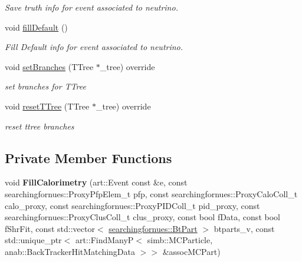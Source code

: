 \begin{DoxyCompactItemize}
\begin{DoxyCompactList}\small\item\em Save truth info for event associated to neutrino. \end{DoxyCompactList}\item 
void \hyperlink{classanalysis_1_1CalorimetryAnalysis_a724b38be467f664fcd7949c097daf8f0}{fill\+Default} ()\hypertarget{classanalysis_1_1CalorimetryAnalysis_a724b38be467f664fcd7949c097daf8f0}{}\label{classanalysis_1_1CalorimetryAnalysis_a724b38be467f664fcd7949c097daf8f0}

\begin{DoxyCompactList}\small\item\em Fill Default info for event associated to neutrino. \end{DoxyCompactList}\item 
void \hyperlink{classanalysis_1_1CalorimetryAnalysis_a65cbc0374aa07d5471f6fc1d2fa3a336}{set\+Branches} (T\+Tree $\ast$\+\_\+tree) override\hypertarget{classanalysis_1_1CalorimetryAnalysis_a65cbc0374aa07d5471f6fc1d2fa3a336}{}\label{classanalysis_1_1CalorimetryAnalysis_a65cbc0374aa07d5471f6fc1d2fa3a336}

\begin{DoxyCompactList}\small\item\em set branches for T\+Tree \end{DoxyCompactList}\item 
void \hyperlink{classanalysis_1_1CalorimetryAnalysis_adc92db8dddbb8a7e1cde1a25684f489e}{reset\+T\+Tree} (T\+Tree $\ast$\+\_\+tree) override\hypertarget{classanalysis_1_1CalorimetryAnalysis_adc92db8dddbb8a7e1cde1a25684f489e}{}\label{classanalysis_1_1CalorimetryAnalysis_adc92db8dddbb8a7e1cde1a25684f489e}

\begin{DoxyCompactList}\small\item\em reset ttree branches \end{DoxyCompactList}\end{DoxyCompactItemize}
\subsection*{Private Member Functions}
\begin{DoxyCompactItemize}
\item 
void {\bfseries Fill\+Calorimetry} (art\+::\+Event const \&e, const searchingfornues\+::\+Proxy\+Pfp\+Elem\+\_\+t pfp, const searchingfornues\+::\+Proxy\+Calo\+Coll\+\_\+t calo\+\_\+proxy, const searchingfornues\+::\+Proxy\+P\+I\+D\+Coll\+\_\+t pid\+\_\+proxy, const searchingfornues\+::\+Proxy\+Clus\+Coll\+\_\+t clus\+\_\+proxy, const bool f\+Data, const bool f\+Shr\+Fit, const std\+::vector$<$ \hyperlink{structsearchingfornues_1_1BtPart}{searchingfornues\+::\+Bt\+Part} $>$ btparts\+\_\+v, const std\+::unique\+\_\+ptr$<$ art\+::\+Find\+ManyP$<$ simb\+::\+M\+C\+Particle, anab\+::\+Back\+Tracker\+Hit\+Matching\+Data $>$$>$ \&assoc\+M\+C\+Part)\hypertarget{classanalysis_1_1CalorimetryAnalysis_af0f65a8080fbc0840646dcdd8761f806}{}\label{classanalysis_1_1CalorimetryAnalysis_af0f65a8080fbc0840646dcdd8761f806}

\end{DoxyCompactItemize}
